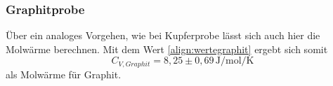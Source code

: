 \subsubsection{Graphitprobe}
Über ein analoges Vorgehen, wie bei Kupferprobe lässt sich auch hier die Molwärme berechnen. Mit dem Wert
\ref{align:wertegraphit} ergebt sich somit 
\begin{equation}
    C_{V,Graphit} = 8,25 \pm 0,69\, \si{\joule\per\mole\per\kelvin}
\end{equation}
als Molwärme für Graphit.



